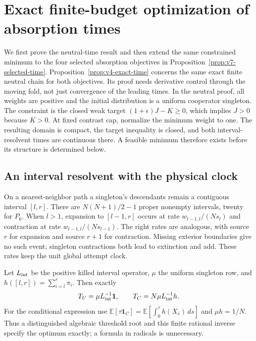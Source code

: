 \documentclass[aps,pre,reprint,amsmath,amssymb,longbibliography]{revtex4-2}
\newcommand{\E}{\mathbb E}
\begin{document}
\section{Exact finite-budget optimization of absorption times}
\label{app:v4-exact-time}


We first prove the neutral-time result and then extend the same constrained minimum to the four selected absorption objectives in Proposition~\ref{prop:v7-selected-time}.
Proposition~\ref{prop:v4-exact-time} concerns the same exact finite
neutral chain for both objectives. Its proof needs derivative control
through the moving fold, not just convergence of the leading times.
In the neutral proof, all weights are positive and the initial
distribution is a uniform cooperator singleton. The constraint is the closed weak target
$(1+\epsilon)J-K\ge0$, which implies $J>0$ because $K>0$.
At fixed contrast cap, normalize the minimum weight to one. The
resulting domain is compact, the target inequality is closed, and both
interval-resolvent times are continuous there. A feasible minimum
therefore exists before its structure is determined below.

\subsection{An interval resolvent with the physical clock}
On a nearest-neighbor path a singleton's descendants remain a contiguous
interval $[l,r]$. There are $N(N+1)/2-1$ proper nonempty intervals,
twenty for $P_6$. When $l>1$, expansion to $[l-1,r]$ occurs at rate
$w_{l-1,l}/(Ns_l)$ and contraction at rate
$w_{l-1,l}/(Ns_{l-1})$. The right rates are analogous, with source $r$
for expansion and source $r+1$ for contraction. Missing exterior
boundaries give no such event; singleton contractions both lead to
extinction and add. These rates keep the unit global attempt clock.

Let $L_{\rm int}$ be the positive killed interval operator, $\mu$ the
uniform singleton row, and $h([l,r])=\sum_{i=l}^r\pi_i$. Then exactly
\begin{equation}
 T_U=\mu L_{\rm int}^{-1}\mathbf1,\qquad
 T_C=N\mu L_{\rm int}^{-1}h.
 \label{eq:v4-interval-times}
\end{equation}
For the conditional expression use
$\E[\tau\mathbf1_C]=\E\!\left[\int_0^\tau h(X_s)\,ds\right]$
and $\mu h=1/N$. Thus a distinguished algebraic threshold root and
this finite rational inverse specify the optimum exactly; a formula in
radicals is unnecessary.
\end{document}
